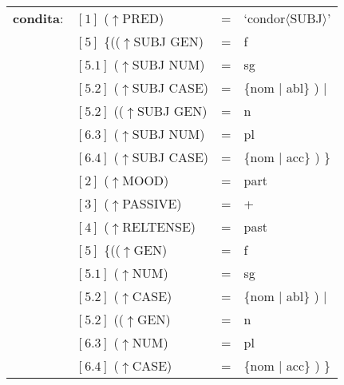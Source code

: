 \documentclass[12pt,a4paper]{article}
\begin{document}
\begin{singlespace}
\begin{tabular}{ l  l  l  l  } 
\textbf{condita}: & $[1]$ \:  ($\uparrow$PRED) & = & `condor$\langle$SUBJ$\rangle$'\\
$\qquad$ & $[5]$ \:  \{(($\uparrow$SUBJ GEN) & = & f \\ 
$\qquad$ & $[5.1]$ \:  ($\uparrow$SUBJ NUM) & = & sg \\
$\qquad$ & $[5.2]$ \:  ($\uparrow$SUBJ CASE) & = & \{nom $\mid$ abl\} ) $\mid$\\
$\qquad$ & $[5.2]$ \: (($\uparrow$SUBJ GEN) & = & n \\
$\qquad$ & $[6.3]$ \:  ($\uparrow$SUBJ NUM) & = & pl \\
$\qquad$ & $[6.4]$ \:  ($\uparrow$SUBJ CASE) & = & \{nom $\mid$ acc\} ) \}\\
$\qquad$ & $[2]$ \:  ($\uparrow$MOOD) & = & part\\
$\qquad$ & $[3]$ \:  ($\uparrow$PASSIVE) & = & + \\
$\qquad$ & $[4]$ \:  ($\uparrow$RELTENSE) & = & past \\
$\qquad$ & $[5]$ \:  \{(($\uparrow$GEN) & = & f \\ 
$\qquad$ & $[5.1]$ \:  ($\uparrow$NUM) & = & sg \\
$\qquad$ & $[5.2]$ \:  ($\uparrow$CASE) & = & \{nom $\mid$ abl\} ) $\mid$\\
$\qquad$ & $[5.2]$ \: (($\uparrow$GEN) & = & n \\
$\qquad$ & $[6.3]$ \:  ($\uparrow$NUM) & = & pl \\
$\qquad$ & $[6.4]$ \:  ($\uparrow$CASE) & = & \{nom $\mid$ acc\} ) \}\\
\end{tabular}
\newline
\newline
\end{singlespace}
\end{document}
